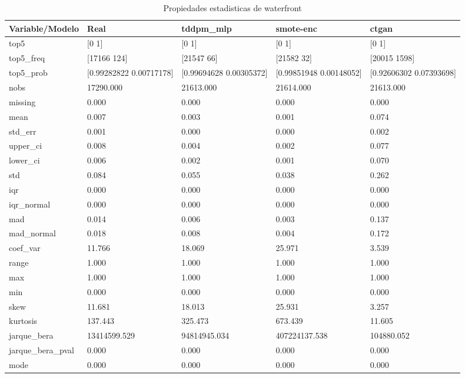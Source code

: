 \begin{table}[H]
\centering
\caption{Propiedades  estadisticas de waterfront}
\label{table-stats-waterfront}
\begin{tabular}{|l|m{10em}|m{10em}|m{10em}|m{10em}|}
\hline
 \rowcolor[gray]{0.8}
Variable/Modelo & Real & tddpm\_mlp & smote-enc & ctgan \\
\hline top5 & [0 1] & [0 1] & [0 1] & [0 1] \\
\hline top5\_freq & [17166   124] & [21547    66] & [21582    32] & [20015  1598] \\
\hline top5\_prob & [0.99282822 0.00717178] & [0.99694628 0.00305372] & [0.99851948 0.00148052] & [0.92606302 0.07393698] \\
\hline nobs & 17290.000 & 21613.000 & 21614.000 & 21613.000 \\
\hline missing & 0.000 & 0.000 & 0.000 & 0.000 \\
\hline mean & 0.007 & 0.003 & 0.001 & 0.074 \\
\hline std\_err & 0.001 & 0.000 & 0.000 & 0.002 \\
\hline upper\_ci & 0.008 & 0.004 & 0.002 & 0.077 \\
\hline lower\_ci & 0.006 & 0.002 & 0.001 & 0.070 \\
\hline std & 0.084 & 0.055 & 0.038 & 0.262 \\
\hline iqr & 0.000 & 0.000 & 0.000 & 0.000 \\
\hline iqr\_normal & 0.000 & 0.000 & 0.000 & 0.000 \\
\hline mad & 0.014 & 0.006 & 0.003 & 0.137 \\
\hline mad\_normal & 0.018 & 0.008 & 0.004 & 0.172 \\
\hline coef\_var & 11.766 & 18.069 & 25.971 & 3.539 \\
\hline range & 1.000 & 1.000 & 1.000 & 1.000 \\
\hline max & 1.000 & 1.000 & 1.000 & 1.000 \\
\hline min & 0.000 & 0.000 & 0.000 & 0.000 \\
\hline skew & 11.681 & 18.013 & 25.931 & 3.257 \\
\hline kurtosis & 137.443 & 325.473 & 673.439 & 11.605 \\
\hline jarque\_bera & 13414599.529 & 94814945.034 & 407224137.538 & 104880.052 \\
\hline jarque\_bera\_pval & 0.000 & 0.000 & 0.000 & 0.000 \\
\hline mode & 0.000 & 0.000 & 0.000 & 0.000 \\

\end{tabular}
\end{table}
